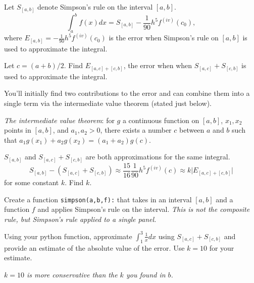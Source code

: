 \documentclass[12pt,letterpaper,noanswers]{exam}
\begin{document}
\begin{questions}
Let $S_{[a,b]}$ denote Simpson's rule on the interval $[a,b]$.  \[\displaystyle\int_a^b f(x)dx = S_{[a,b]}-\frac{1}{90}h^5f^{(iv)}(c_0),\] where $E_{[a,b]}=-\frac{1}{90}h^5f^{(iv)}(c_0)$ is the error when Simpson's rule on $[a,b]$ is used to approximate the integral.

\begin{parts}
\item Let $c = (a+b)/2$.  Find $E_{[a,c]+[c,b]}$, the error when when $S_{[a,c]} + S_{[c,b]}$ is used to approximate the integral.

You'll initially find two contributions to the error and can combine them into a single term via the intermediate value theorem (stated just below).

\emph{The intermediate value theorem}: for $g$ a continuous function on $[a,b]$, $x_1, x_2$ points in $[a,b]$, and $a_1, a_2>0$, there exists a number $c$ between $a$ and $b$ such that $a_1g(x_1) + a_2g(x_2) = (a_1+a_2)g(c)$.


\item $S_{[a,b]}$ and $S_{[a,c]}+S_{[c,b]}$ are both approximations for the same integral.  \[S_{[a,b]}-\left(S_{[a,c]}+S_{[c,b]}\right) \approx \frac{15}{16}\frac{1}{90}h^5f^{(iv)}(c) \approx k\vert E_{[a,c]+[c,b]}\vert\] for some constant $k$.  Find $k$.

\item Create a function \texttt{simpson(a,b,f):} that takes in an interval $[a,b]$ and a function $f$ and applies Simpson's rule on the interval.  \emph{This is not the composite rule, but Simpson's rule applied to a single panel.}

\item Using your python function, approximate $\displaystyle\int_1^3 \frac{1}{x} dx$ using $S_{[a,c]}+S_{[c,b]}$ and provide an estimate of the absolute value of the error.  Use $k = 10$ for your estimate.

\emph{$k=10$ is more conservative than the $k$ you found in $b$.}
\end{parts}
\end{questions}
\end{document}
